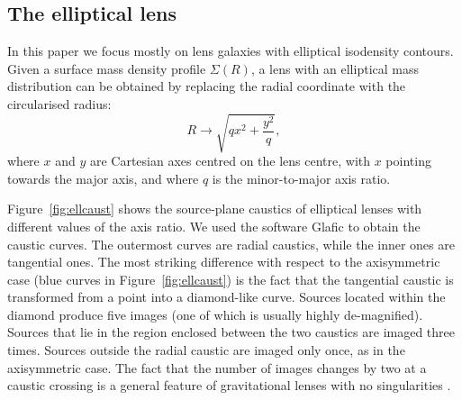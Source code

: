 \documentclass{aa}
\def\Fref#1{Figure~\ref{#1}\xspace}
\begin{document}

\subsection{The elliptical lens}

In this paper we focus mostly on lens galaxies with elliptical isodensity contours.
Given a surface mass density profile $\Sigma(R)$, a lens with an elliptical mass distribution can be obtained by replacing the radial coordinate with the circularised radius:
\begin{equation}\label{eq:elltransf}
R \rightarrow \sqrt{qx^2 + \frac{y^2}{q}},
\end{equation}
where $x$ and $y$ are Cartesian axes centred on the lens centre, with $x$ pointing towards the major axis, and where $q$ is the minor-to-major axis ratio.

\Fref{fig:ellcaust} shows the source-plane caustics of elliptical lenses with different values of the axis ratio. We used the software {\sc Glafic} \citep{Ogu21} to obtain the caustic curves.
The outermost curves are radial caustics, while the inner ones are tangential ones.
The most striking difference with respect to the axisymmetric case (blue curves in \Fref{fig:ellcaust}) is the fact that the tangential caustic is transformed from a point into a diamond-like curve.
Sources located within the diamond produce five images (one of which is usually highly de-magnified). Sources that lie in the region enclosed between the two caustics are imaged three times. Sources outside the radial caustic are imaged only once, as in the axisymmetric case.
The fact that the number of images changes by two at a caustic crossing is a general feature of gravitational lenses with no singularities \citep{SEF92}.
\end{document}
